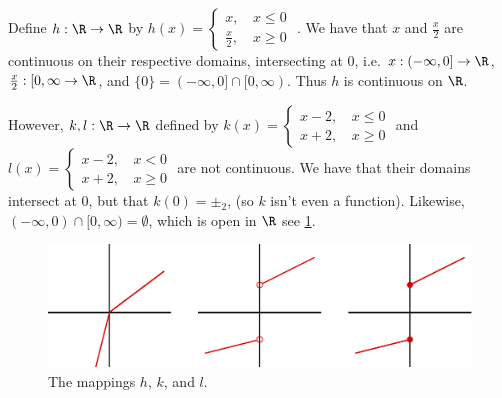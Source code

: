 \begin{example}
        Define $h:\R \rightarrow \R$ by $h(x)=
            \begin{cases}
                x \text{, } & x \leq 0 \\
                \frac{x}{2} \text{, } & x \geq 0
            \end{cases}$
        . We have that $x$ and  $\frac{x}{2}$ are continuous on their respective domains,
        intersecting at $0$, i.e.  $x:(-\infty,0] \rightarrow \R$, $ \frac{x}{2}:[0,\infty
        \rightarrow \R$, and $\{0\}=(-\infty, 0] \cap [0, \infty)$. Thus $h$ is continuous on $\R$.


        However, $k,l:\R \rightarrow \R$ defined by $k(x)=
            \begin{cases}
                x-2 \text{, } & x \leq 0 \\
                x+2 \text{, } & x \geq 0
            \end{cases}$
            and $l(x)=
            \begin{cases}
                x-2 \text{, } & x < 0 \\
                x+2 \text{, } & x \geq 0
            \end{cases}$
            are not continuous. We have that their domains intersect at $0$, but that  $k(0)=\pm_2$,
            (so $k$ isn't even a function). Likewise, $(-\infty,0) \cap [0,\infty)=\emptyset$, which
            is open in $\R$ see \ref{fig_1.9}.

            \begin{figure}[h]
                \centering
                \includegraphics[scale = 0.5]{Figures/chapter1/pasting_lemma.eps}
                \caption{The mappings $h$, $k$, and  $l$.}
                \label{fig_1.9}
            \end{figure}
\end{example}

